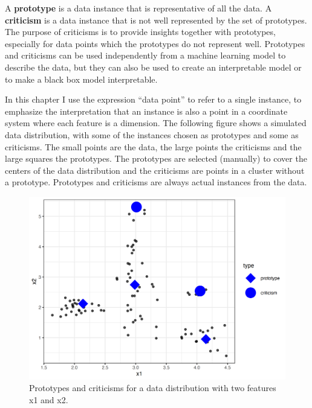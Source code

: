\documentclass[12pt,]{krantz}
\begin{document}
A \textbf{prototype} is a data instance that is representative of all
the data. A \textbf{criticism} is a data instance that is not well
represented by the set of prototypes. The purpose of criticisms is to
provide insights together with prototypes, especially for data points
which the prototypes do not represent well. Prototypes and criticisms
can be used independently from a machine learning model to describe the
data, but they can also be used to create an interpretable model or to
make a black box model interpretable.

In this chapter I use the expression ``data point'' to refer to a single
instance, to emphasize the interpretation that an instance is also a
point in a coordinate system where each feature is a dimension. The
following figure shows a simulated data distribution, with some of the
instances chosen as prototypes and some as criticisms. The small points
are the data, the large points the criticisms and the large squares the
prototypes. The prototypes are selected (manually) to cover the centers
of the data distribution and the criticisms are points in a cluster
without a prototype. Prototypes and criticisms are always actual
instances from the data.

\begin{figure}

{\centering \includegraphics[width=\textwidth]{images/unnamed-chunk-23-1} 

}

\caption{Prototypes and criticisms for a data distribution with two features x1 and x2.}\label{fig:unnamed-chunk-23}
\end{figure}
\end{document}
